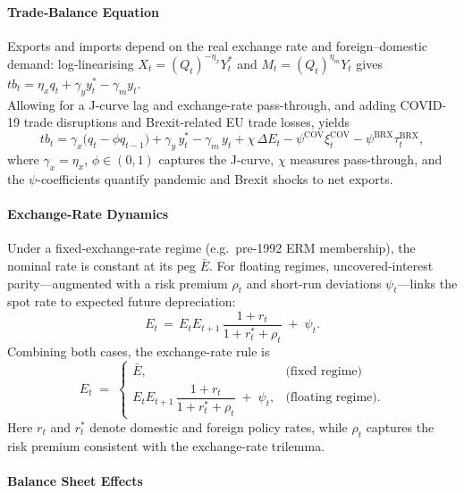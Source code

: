 \documentclass[
]{article}
\begin{document}
	
	\paragraph*{Trade‐Balance Equation}%
	Exports and imports depend on the real exchange rate and foreign–domestic demand: log‐linearising \(X_t=(Q_t)^{-\eta_x}Y_t^{*}\) and \(M_t=(Q_t)^{\eta_m}Y_t\) gives \(tb_t=\eta_x q_t+\gamma_y y_t^{*}-\gamma_m y_t\). \\
	Allowing for a J-curve lag and exchange-rate pass-through, and adding COVID-19 trade disruptions and Brexit-related EU trade losses, yields
	\begin{equation}
		tb_t
		= \gamma_x\bigl(q_t-\phi q_{t-1}\bigr)
		+ \gamma_y\,y_t^{*}
		- \gamma_m\,y_t
		+ \chi\,\Delta E_t
		- \psi^{\mathrm{COV}}\xi_t^{\mathrm{COV}}
		- \psi^{\mathrm{BRX}}\tau_t^{\mathrm{BRX}},
		\label{eq:tb_condensed}
	\end{equation}
	where \(\gamma_x=\eta_x\), \(\phi\in(0,1)\) captures the J-curve, \(\chi\) measures pass-through, and the \(\psi\)-coefficients quantify pandemic and Brexit shocks to net exports.
	
	\paragraph{Exchange-Rate Dynamics}
	Under a fixed‐exchange‐rate regime (e.g.\ pre-1992 ERM membership), the nominal rate is constant at its peg \(\bar{E}\).%
	For floating regimes, uncovered-interest parity—augmented with a risk premium \(\rho_t\) and short-run deviations \(\psi_t\)—links the spot rate to expected future depreciation:
	\[
	E_t\,=\,
	E_t E_{t+1}\,\frac{1+r_t}{1+r_t^{*}+\rho_t}\;+\;\psi_t.
	\]
	Combining both cases, the exchange-rate rule is
	\begin{equation}
		E_t \;=\;
		\begin{cases}
			\bar{E}, &
			\text{(fixed regime)}\\[4pt]
			E_t E_{t+1}\,\dfrac{1+r_t}{1+r_t^{*}+\rho_t}\;+\;\psi_t, &
			\text{(floating regime).}
		\end{cases}
		\label{eq:uip_condensed}
	\end{equation}
	Here \(r_t\) and \(r_t^{*}\) denote domestic and foreign policy rates, while \(\rho_t\) captures the risk premium consistent with the exchange-rate trilemma.
	
	\paragraph*{Balance Sheet Effects}
	
\end{document}
